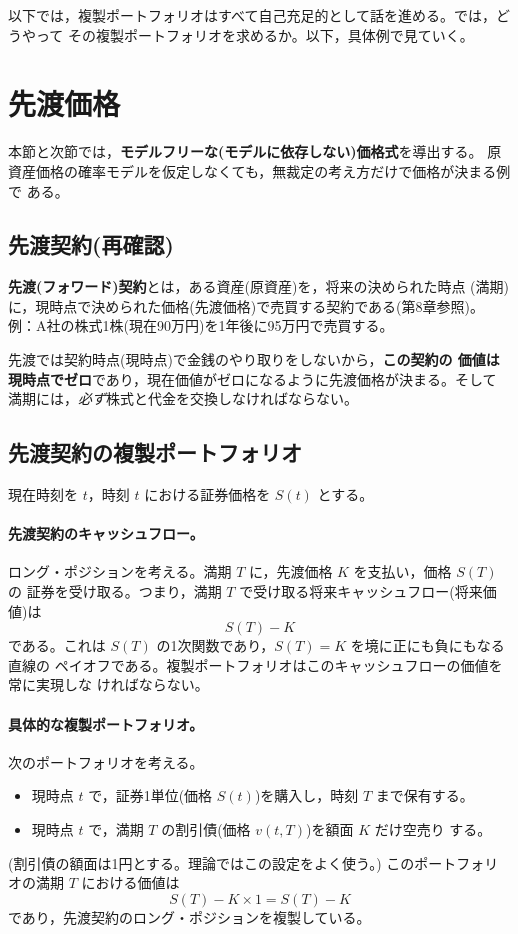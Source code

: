 以下では，複製ポートフォリオはすべて自己充足的として話を進める。では，どうやって
その複製ポートフォリオを求めるか。以下，具体例で見ていく。

\section{先渡価格}

本節と次節では，\textbf{モデルフリーな(モデルに依存しない)価格式}を導出する。
原資産価格の確率モデルを仮定しなくても，無裁定の考え方だけで価格が決まる例で
ある。

\subsection{先渡契約(再確認)}

\textbf{先渡(フォワード)契約}とは，ある資産(原資産)を，将来の決められた時点
(満期)に，現時点で決められた価格(先渡価格)で売買する契約である(第8章参照)。
例：A社の株式1株(現在90万円)を1年後に95万円で売買する。

先渡では契約時点(現時点)で金銭のやり取りをしないから，\textbf{この契約の
価値は現時点でゼロ}であり，現在価値がゼロになるように先渡価格が決まる。そして
満期には，\emph{必ず}株式と代金を交換しなければならない。

\subsection{先渡契約の複製ポートフォリオ}

現在時刻を $t$，時刻 $t$ における証券価格を $S(t)$ とする。

\paragraph{先渡契約のキャッシュフロー。}
ロング・ポジションを考える。満期 $T$ に，先渡価格 $K$ を支払い，価格 $S(T)$ の
証券を受け取る。つまり，満期 $T$ で受け取る将来キャッシュフロー(将来価値)は
\begin{equation}
S(T) - K
\end{equation}
である。これは $S(T)$ の1次関数であり，$S(T)=K$ を境に正にも負にもなる直線の
ペイオフである。複製ポートフォリオはこのキャッシュフローの価値を常に実現しな
ければならない。

\paragraph{具体的な複製ポートフォリオ。}
次のポートフォリオを考える。
\begin{itemize}
\item 現時点 $t$ で，証券1単位(価格 $S(t)$)を購入し，時刻 $T$ まで保有する。
\item 現時点 $t$ で，満期 $T$ の割引債(価格 $v(t,T)$)を額面 $K$ だけ空売り
する。
\end{itemize}
(割引債の額面は1円とする。理論ではこの設定をよく使う。)
このポートフォリオの満期 $T$ における価値は
\[
S(T) - K \times 1 = S(T) - K
\]
であり，先渡契約のロング・ポジションを複製している。

